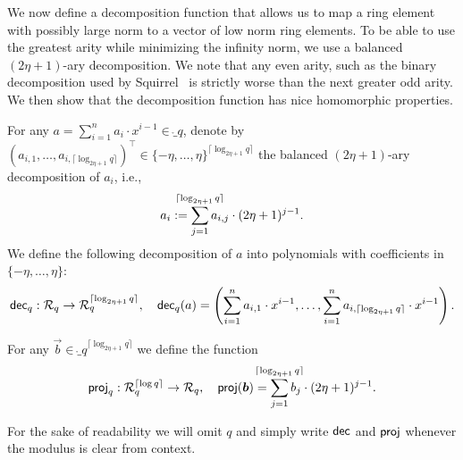 We now define a decomposition function that allows us to map a ring element with possibly large norm to a vector of low norm ring elements.
To be able to use the greatest arity while minimizing the infinity norm, we use a balanced $(2\eta+1)$-ary decomposition.
We note that any even arity, such as the binary decomposition used by Squirrel~\cite{CCS:FleSimZha22} is strictly worse than the next greater odd arity.
We then show that the decomposition function has nice homomorphic properties.
\begin{definition}
    For any $a = \sum_{i=1}^{n} a_i\cdot x^{i-1}  \in \ring_q$,
    denote by $(a_{i,1},\dots,a_{i,\lceil \log_{2\eta+1} q \rceil})^\intercal\in \{-\eta,\dots,\eta\}^{\lceil\log_{2\eta+1} q\rceil}$ the balanced $(2\eta+1)$-ary decomposition of $a_i$, i.e.,
    \[a_{i} := \smashoperator{\sum_{j=1}^{\lceil\log_{2\eta+1} q\rceil}} a_{i,j}\cdot (2\eta+1)^{j-1}.\]
    We define the following decomposition of $a$ into polynomials with coefficients in $\{-\eta,\dots,\eta\}$:
    \begin{equation*}
        \mathsf{dec}_q: \mathcal{R}_q \to \mathcal{R}_q^{\lceil\log_{2\eta+1} q\rceil},\quad
        \mathsf{dec}_q(a) = \left(\sum_{i=1}^{n} a_{i,1}\cdot x^{i-1}, \dots, \sum_{i=1}^{n} a_{i,\lceil\log_{2\eta+1} q\rceil}\cdot x^{i-1} \right).
    \end{equation*}
\end{definition}

\begin{definition}\label{def:proj}
  For any $\vec{b} \in \ring_q^{\lceil\log_{2\eta+1} q\rceil}$ we define the function 
  \[
    \proj_q : \ring_q^{\lceil\log q\rceil} \to \ring_q,\quad \proj(\vec{b}) = \smashoperator{\sum_{j=1}^{\lceil\log_{2\eta+1} q\rceil}} b_j\cdot(2\eta+1)^{j-1}.
  \]
\end{definition}

For the sake of readability we will omit $q$ and simply write $\mathsf{dec}$ and $\mathsf{proj}$ whenever the modulus is clear from context.

